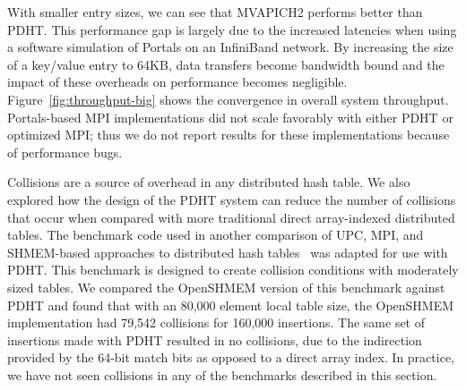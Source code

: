 With smaller
entry sizes, we can see that MVAPICH2 performs better than PDHT. 
This performance gap is largely due to the increased latencies when using a
software simulation of Portals on an InfiniBand network. By increasing the size of a key/value entry to
64KB, data transfers become bandwidth bound and the impact of these overheads on performance becomes negligible.
Figure~\ref{fig:throughput-big} shows the convergence in overall system
throughput. Portals-based MPI implementations did not scale favorably with
either PDHT or optimized MPI; thus we do not report results for these implementations because of performance bugs.



Collisions are a source of overhead in any distributed hash table. We also explored
how the design of the PDHT system can reduce the number of collisions that 
occur when compared with  more traditional direct
array-indexed distributed tables. The benchmark code used in another comparison
of UPC, MPI, and SHMEM-based approaches to distributed hash
tables~\cite{maynard:12} was adapted for use with PDHT. This benchmark is
designed to create collision conditions with moderately sized tables. We
compared the OpenSHMEM version of this benchmark against PDHT and found that
with an 80,000 element local table size, the OpenSHMEM implementation had
79,542 collisions for 160,000 insertions. The same set of insertions made with
PDHT resulted in no collisions, due to the indirection provided by the
64-bit match bits as opposed to a direct array index. In practice, we have
not seen collisions in any of the benchmarks described in this section.




